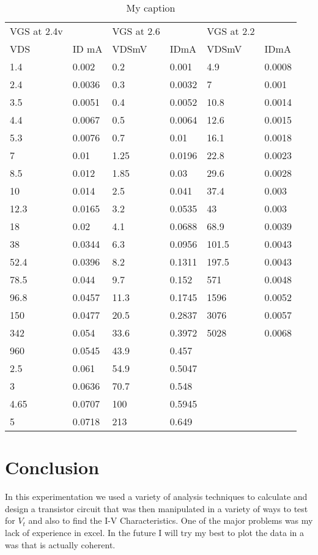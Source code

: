 \documentclass[12pt]{article}
\begin{document}
\begin{table}[]
	\centering
	\caption{My caption}
	\label{my-label}
	\begin{tabular}{llllll}
		VGS at 2.4v &        & VGS at 2.6 &        & VGS at 2.2 &        \\
		VDS         & ID mA  & VDSmV      & IDmA   & VDSmV      & IDmA   \\
		1.4         & 0.002  & 0.2        & 0.001  & 4.9        & 0.0008 \\
		2.4         & 0.0036 & 0.3        & 0.0032 & 7          & 0.001  \\
		3.5         & 0.0051 & 0.4        & 0.0052 & 10.8       & 0.0014 \\
		4.4         & 0.0067 & 0.5        & 0.0064 & 12.6       & 0.0015 \\
		5.3         & 0.0076 & 0.7        & 0.01   & 16.1       & 0.0018 \\
		7           & 0.01   & 1.25       & 0.0196 & 22.8       & 0.0023 \\
		8.5         & 0.012  & 1.85       & 0.03   & 29.6       & 0.0028 \\
		10          & 0.014  & 2.5        & 0.041  & 37.4       & 0.003  \\
		12.3        & 0.0165 & 3.2        & 0.0535 & 43         & 0.003  \\
		18          & 0.02   & 4.1        & 0.0688 & 68.9       & 0.0039 \\
		38          & 0.0344 & 6.3        & 0.0956 & 101.5      & 0.0043 \\
		52.4        & 0.0396 & 8.2        & 0.1311 & 197.5      & 0.0043 \\
		78.5        & 0.044  & 9.7        & 0.152  & 571        & 0.0048 \\
		96.8        & 0.0457 & 11.3       & 0.1745 & 1596       & 0.0052 \\
		150         & 0.0477 & 20.5       & 0.2837 & 3076       & 0.0057 \\
		342         & 0.054  & 33.6       & 0.3972 & 5028       & 0.0068 \\
		960         & 0.0545 & 43.9       & 0.457  &            &        \\
		2.5         & 0.061  & 54.9       & 0.5047 &            &        \\
		3           & 0.0636 & 70.7       & 0.548  &            &        \\
		4.65        & 0.0707 & 100        & 0.5945 &            &        \\
		5           & 0.0718 & 213        & 0.649  &            &       
	\end{tabular}
\end{table}

\section{Conclusion}

In this experimentation we used a variety of analysis techniques to calculate and design a transistor circuit that was then manipulated in a variety of ways to test for $V_t$ and also to find the I-V Characteristics. One of the major problems was my lack of experience in excel. In the future I will try my best to plot the data in a was that is actually coherent.
\end{document}
